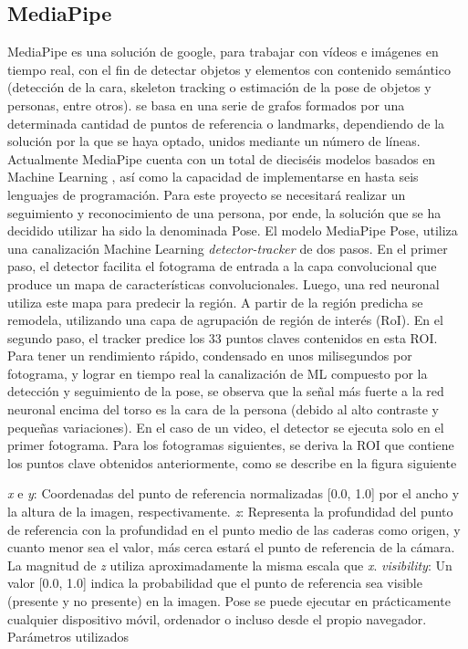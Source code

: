 \documentclass[twoside,11pt]{article}
\begin{document}
\subsection{MediaPipe}
MediaPipe es una solución de google,  para trabajar con vídeos e imágenes en 
tiempo real, con el fin de detectar objetos y elementos con contenido semántico
(detección de la cara, skeleton tracking o estimación de la pose de objetos y personas, entre otros).
se basa en una serie de grafos formados por una determinada cantidad de puntos de referencia o landmarks,
dependiendo de la solución por la que se haya optado, unidos mediante un número de líneas.
Actualmente MediaPipe cuenta con un total de dieciséis modelos basados en Machine Learning
, así como la capacidad de implementarse en hasta seis lenguajes de programación.
Para este proyecto se necesitará realizar un seguimiento y reconocimiento de una persona, por
ende, la solución que se ha decidido utilizar ha sido la denominada Pose.
El modelo MediaPipe Pose, utiliza una canalización Machine Learning \textit{detector-tracker}
de dos pasos. En el primer paso, el detector facilita 
el fotograma de entrada a la capa convolucional 
que produce un mapa de características convolucionales.
Luego, una red neuronal utiliza este mapa para predecir 
la región. A partir de la región predicha se remodela, 
utilizando una capa de agrupación de región de interés (RoI). 
En el segundo paso, el tracker predice los 33 puntos claves
 contenidos en esta ROI. Para tener un rendimiento rápido, 
 condensado en unos milisegundos por fotograma, y lograr 
 en tiempo real la canalización de ML compuesto por la 
 detección y seguimiento de la pose, se observa que la 
 señal más fuerte a la red neuronal encima del torso es 
 la cara de la persona (debido al alto contraste y pequeñas variaciones). 
 En el caso de un video, el detector se ejecuta solo 
 en el primer fotograma. Para los fotogramas siguientes, 
 se deriva la ROI que contiene los puntos clave obtenidos 
 anteriormente, como se describe en la figura siguiente

 \textit{x} e \textit{y}: Coordenadas del punto de referencia 
 normalizadas [0.0, 1.0] por el ancho y la altura de la imagen, 
 respectivamente.
 \textit{z}: Representa la profundidad del punto de referencia 
 con la profundidad en el punto medio de las caderas como origen, 
 y cuanto menor sea el valor, más cerca estará el punto de referencia 
 de la cámara. La magnitud de \textit{z} utiliza aproximadamente 
 la misma escala que \textit{x}.
 \textit{visibility}: Un valor [0.0, 1.0] indica la probabilidad 
 que el punto de referencia sea visible (presente y no presente) en 
 la imagen.
 Pose se puede ejecutar en prácticamente cualquier dispositivo móvil,
 ordenador o incluso desde el propio navegador.
Parámetros utilizados
\end{document}
